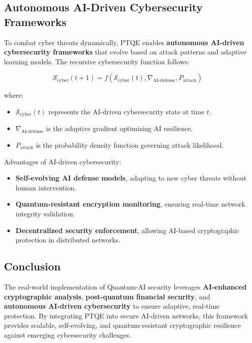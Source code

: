 \documentclass{article}
\theoremstyle{plain}
\begin{document}
\begin{itemize}
\subsection{Autonomous AI-Driven Cybersecurity Frameworks}

To combat cyber threats dynamically, PTQE enables \textbf{autonomous AI-driven cybersecurity frameworks} that evolve based on attack patterns and adaptive learning models. The recursive cybersecurity function follows:

\begin{equation}
    \mathcal{S}_{\text{cyber}}(t+1) = f(\mathcal{S}_{\text{cyber}}(t), \nabla_{\text{AI-defense}}, P_{\text{attack}})
\end{equation}

where:
\begin{itemize}
    \item \( \mathcal{S}_{\text{cyber}}(t) \) represents the AI-driven cybersecurity state at time \( t \).
    \item \( \nabla_{\text{AI-defense}} \) is the adaptive gradient optimizing AI resilience.
    \item \( P_{\text{attack}} \) is the probability density function governing attack likelihood.
\end{itemize}

Advantages of AI-driven cybersecurity:
\begin{itemize}
    \item \textbf{Self-evolving AI defense models}, adapting to new cyber threats without human intervention.
    \item \textbf{Quantum-resistant encryption monitoring}, ensuring real-time network integrity validation.
    \item \textbf{Decentralized security enforcement}, allowing AI-based cryptographic protection in distributed networks.
\end{itemize}

\subsection{Conclusion}

The real-world implementation of Quantum-AI security leverages \textbf{AI-enhanced cryptographic analysis}, \textbf{post-quantum financial security}, and \textbf{autonomous AI-driven cybersecurity} to ensure adaptive, real-time protection. By integrating PTQE into secure AI-driven networks, this framework provides scalable, self-evolving, and quantum-resistant cryptographic resilience against emerging cybersecurity challenges.


\end{itemize}
\end{document}

